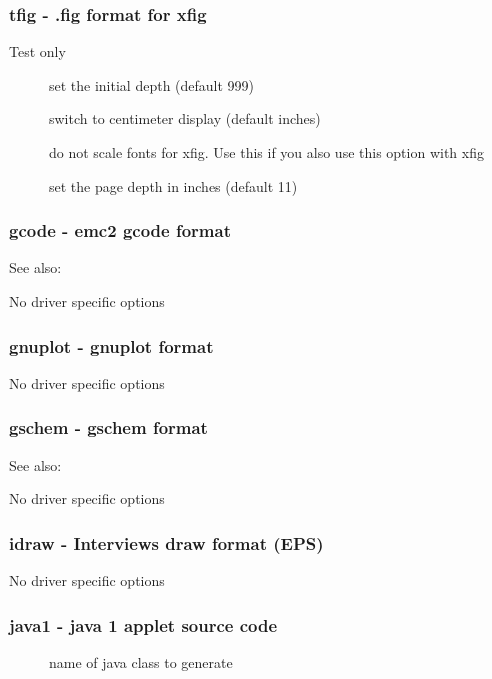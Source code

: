 \documentclass[english,a4paper]{article}
\begin{document}
\subsubsection{tfig - .fig format for xfig}
Test only

\begin{description}
\item[]
set the initial depth (default 999)


\item[]
switch to centimeter display (default inches)


\item[]
do not scale fonts for xfig. Use this if you also use this option with xfig


\item[]
set the page depth in inches (default 11)


\end{description}
\subsubsection{gcode - emc2 gcode format}
See also:  

No driver specific options
\subsubsection{gnuplot - gnuplot format}
No driver specific options
\subsubsection{gschem - gschem format}
See also:  

No driver specific options
\subsubsection{idraw - Interviews draw format (EPS)}
No driver specific options
\subsubsection{java1 - java 1 applet source code}
\begin{description}
\item[]
name of java class to generate


\end{description}
\end{document}
